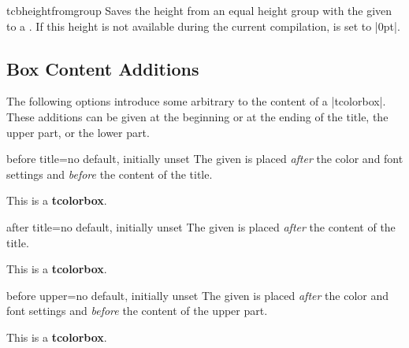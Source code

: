 \begin{docCommand}[doc new=2015-11-27]{tcbheightfromgroup}{}
  Saves the height from an equal height group with the given 
  to a . If this height is not available during the current compilation,
   is set to |0pt|.
\end{docCommand}


\clearpage
\subsection{Box Content Additions}\label{subsec:contentadditions}
The following options introduce some arbitrary  to the content
of a |tcolorbox|. These additions can be given at the beginning or at the ending
of the title, the upper part, or the lower part.

\begin{docTcbKey}{before title}{=}{no default, initially unset}
  The given  is placed \emph{after} the color and font settings
  and \emph{before} the content of the title.
\begin{dispExample}

\begin{tcolorbox}[title=My title]
This is a \textbf{tcolorbox}.
\end{tcolorbox}
\end{dispExample}
\end{docTcbKey}


\begin{docTcbKey}{after title}{=}{no default, initially unset}
  The given  is placed \emph{after} the content of the title.
\begin{dispExample}

\begin{tcolorbox}[title=My title]
This is a \textbf{tcolorbox}.
\end{tcolorbox}
\end{dispExample}
\end{docTcbKey}


\clearpage
\begin{docTcbKey}{before upper}{=}{no default, initially unset}
  The given  is placed \emph{after} the color and font settings
  and \emph{before} the content of the upper part.
\begin{dispExample}

\begin{tcolorbox}[title=My title]
This is a \textbf{tcolorbox}.
\end{tcolorbox}
\end{dispExample}
\end{docTcbKey}


